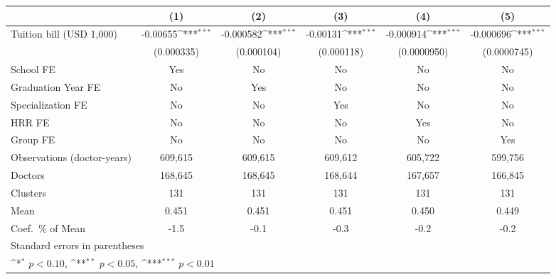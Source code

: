 {
\def\sym#1{\ifmmode^{#1}\else\(^{#1}\)\fi}
\begin{tabular}{l*{5}{c}}
\hline\hline
                    &\multicolumn{1}{c}{(1)}         &\multicolumn{1}{c}{(2)}         &\multicolumn{1}{c}{(3)}         &\multicolumn{1}{c}{(4)}         &\multicolumn{1}{c}{(5)}         \\
\hline
Tuition bill (USD 1,000)&    -0.00655\sym{***}&   -0.000582\sym{***}&    -0.00131\sym{***}&   -0.000914\sym{***}&   -0.000696\sym{***}\\
                    &  (0.000335)         &  (0.000104)         &  (0.000118)         & (0.0000950)         & (0.0000745)         \\
[1em]
School FE           &         Yes         &          No         &          No         &          No         &          No         \\
[1em]
Graduation Year FE  &          No         &         Yes         &          No         &          No         &          No         \\
[1em]
Specialization FE   &          No         &          No         &         Yes         &          No         &          No         \\
[1em]
HRR FE              &          No         &          No         &          No         &         Yes         &          No         \\
[1em]
Group FE            &          No         &          No         &          No         &          No         &         Yes         \\
\hline
Observations (doctor-years)&     609,615         &     609,615         &     609,612         &     605,722         &     599,756         \\
Doctors             &     168,645         &     168,645         &     168,644         &     167,657         &     166,845         \\
Clusters            &         131         &         131         &         131         &         131         &         131         \\
Mean                &       0.451         &       0.451         &       0.451         &       0.450         &       0.449         \\
Coef.\ \% of Mean   &        -1.5         &        -0.1         &        -0.3         &        -0.2         &        -0.2         \\
\hline\hline
\multicolumn{6}{l}{\footnotesize Standard errors in parentheses}\\
\multicolumn{6}{l}{\footnotesize \sym{*} \(p<0.10\), \sym{**} \(p<0.05\), \sym{***} \(p<0.01\)}\\
\end{tabular}
}
